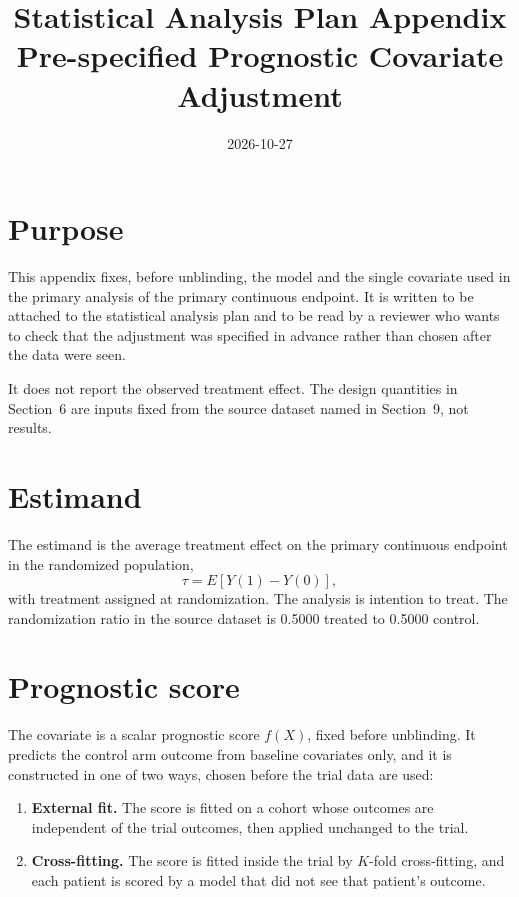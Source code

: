 \documentclass[11pt]{article}
\title{Statistical Analysis Plan Appendix\\Pre-specified Prognostic Covariate Adjustment}
\author{}
\date{2026-10-27}
\begin{document}
\maketitle

\section{Purpose}

This appendix fixes, before unblinding, the model and the single covariate used
in the primary analysis of the primary continuous endpoint. It is written to be
attached to the statistical analysis plan and to be read by a reviewer who wants
to check that the adjustment was specified in advance rather than chosen after
the data were seen.

It does not report the observed treatment effect. The design quantities in
Section~6 are inputs fixed from the source dataset named in Section~9, not
results.

\section{Estimand}

The estimand is the average treatment effect on the primary continuous endpoint
in the randomized population,
\[
\tau = E\left[Y(1) - Y(0)\right],
\]
with treatment assigned at randomization. The analysis is intention to treat.
The randomization ratio in the source dataset is 0.5000 treated to
0.5000 control.

\section{Prognostic score}

The covariate is a scalar prognostic score $f(X)$, fixed before unblinding. It
predicts the control arm outcome from baseline covariates only, and it is
constructed in one of two ways, chosen before the trial data are used:

\begin{enumerate}
\item \textbf{External fit.} The score is fitted on a cohort whose outcomes are
  independent of the trial outcomes, then applied unchanged to the trial.
\item \textbf{Cross-fitting.} The score is fitted inside the trial by
  $K$-fold cross-fitting, and each patient is scored by a model that did not see
  that patient's outcome.
\end{enumerate}
\end{document}
